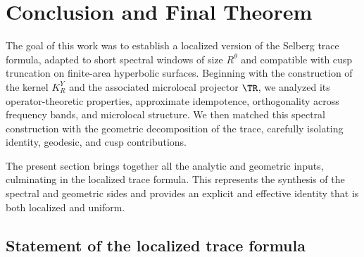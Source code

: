\section{Conclusion and Final Theorem}
\label{sec:conclusion}

The goal of this work was to establish a localized version of the Selberg trace formula, adapted to short spectral windows of size $R^\theta$ and compatible with cusp truncation on finite-area hyperbolic surfaces. Beginning with the construction of the kernel $K_R^Y$ and the associated microlocal projector $\TR$, we analyzed its operator-theoretic properties, approximate idempotence, orthogonality across frequency bands, and microlocal structure. We then matched this spectral construction with the geometric decomposition of the trace, carefully isolating identity, geodesic, and cusp contributions. 

The present section brings together all the analytic and geometric inputs, culminating in the localized trace formula. This represents the synthesis of the spectral and geometric sides and provides an explicit and effective identity that is both localized and uniform.

\subsection{Statement of the localized trace formula}
\label{subsec:final-theorem}


